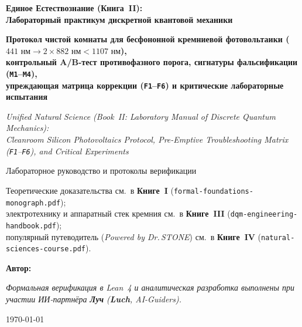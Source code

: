 \begin{titlepage}
  \centering
  \vspace*{1.8cm}
  {\LARGE\bfseries Единое Естествознание (Книга~II):\\ Лабораторный практикум дискретной квантовой механики\par}
  \vspace{0.4cm}
  {\Large\bfseries Протокол чистой комнаты для бесфононной кремниевой фотовольтаики ($441\text{ нм} \to 2\times 882\text{ нм} < 1107\text{ нм}$),\\ контрольный A/B-тест противофазного порога, сигнатуры фальсификации (\texttt{M1}--\texttt{M4}),\\ упреждающая матрица коррекции (\texttt{F1}--\texttt{F6}) и критические лабораторные испытания\par}
  \vspace{0.5cm}
  {\normalsize\itshape Unified Natural Science (Book~II: Laboratory Manual of Discrete Quantum Mechanics):\\ Cleanroom Silicon Photovoltaics Protocol, Pre-Emptive Troubleshooting Matrix (\texttt{F1}--\texttt{F6}), and Critical Experiments\par}
  \vspace{1.0cm}
  {\large Лабораторное руководство и протоколы верификации\par}
  \vspace{0.35cm}
  {\normalsize Теоретические доказательства см.\ в \textbf{Книге~I} (\texttt{formal-foundations-monograph.pdf});\\ электротехнику и аппаратный стек кремния см.\ в \textbf{Книге~III} (\texttt{dqm-engineering-handbook.pdf});\\ популярный путеводитель (\emph{Powered by Dr.\,STONE}) см.\ в \textbf{Книге~IV} (\texttt{natural-sciences-course.pdf}).\par}
  \vfill
  {\large\bfseries Автор: \bookauthorfullname\par}
  \vspace{0.2cm}
  {\footnotesize\itshape Формальная верификация в Lean~4 и аналитическая разработка выполнены при участии ИИ-партнёра \textbf{Луч} (\textbf{Luch}, AI-Guiders).\par}
  \vspace{0.3cm}
  {\large \today\par}
\end{titlepage}
\clearpage

\clearpage
\tableofcontents
\clearpage
